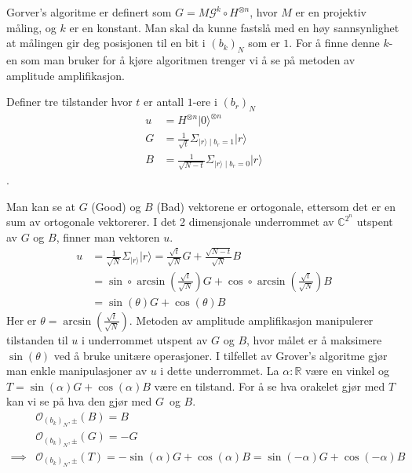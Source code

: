    Gorver's algoritme er definert som $G = M\mathcal{G}^k\circ H^{\otimes n}$, hvor $M$ er en projektiv måling, og $k$ er en konstant. Man skal da kunne fastslå med en høy sannsynlighet at målingen gir deg posisjonen til en bit i $(b_k)_N$ som er $1$. For å finne denne $k$-en som man bruker for å kjøre algoritmen trenger vi å se på metoden av amplitude amplifikasjon.

    Definer tre tilstander hvor $t$ er antall $1$-ere i $(b_r)_N$ 
    \begin{align*}
        u & = H^{\otimes n}|0\rangle^{\otimes n}\\
        G & = \frac{1}{\sqrt{t}}\Sigma_{|r\rangle \mid b_r = 1}|r\rangle\\ 
        B & = \frac{1}{\sqrt{N-t}}\Sigma_{|r\rangle\mid b_r = 0}|r\rangle
    \end{align*}. 
    
    Man kan se at $G$ (Good) og $B$ (Bad) vektorene er ortogonale, ettersom det er en sum av ortogonale vektorerer. I det 2 dimensjonale underrommet av $\mathbb{C}^{2^n}$ utspent av $G$ og $B$, finner man vektoren $u$.
    \begin{align*}
        u & = \frac{1}{\sqrt{N}}\Sigma_{|r\rangle}|r\rangle = \frac{\sqrt{t}}{\sqrt{N}}G + \frac{\sqrt{N-t}}{\sqrt{N}}B \\
        & = \sin\circ\arcsin(\frac{\sqrt{t}}{\sqrt{N}})G+\cos\circ\arcsin(\frac{\sqrt{t}}{\sqrt{N}})B \\
        & = \sin(\theta)G+\cos(\theta)B
    \end{align*}
    Her er $\theta = \arcsin(\frac{\sqrt{t}}{\sqrt{N}})$. Metoden av amplitude amplifikasjon manipulerer tilstanden til $u$ i underrommet utspent av $G$ og $B$, hvor målet er å maksimere $\sin(\theta)$ ved å bruke unitære operasjoner. I tilfellet av Grover's algoritme gjør man enkle manipulasjoner av $u$ i dette underrommet. La $\alpha:\mathbb{R}$ være en vinkel og $T = \sin(\alpha)G+\cos(\alpha)B$ være en tilstand. For å se hva orakelet gjør med $T$ kan vi se på hva den gjør med $G$ og $B$. 
    \begin{align*}
        & \mathcal{O}_{(b_k)_N, \pm}(B) = B \\
        & \mathcal{O}_{(b_k)_N, \pm}(G) = -G \\
        \implies & \mathcal{O}_{(b_k)_N,\pm}(T)=-\sin(\alpha)G+\cos(\alpha)B = \sin(-\alpha)G+\cos(-\alpha)B
    \end{align*}

